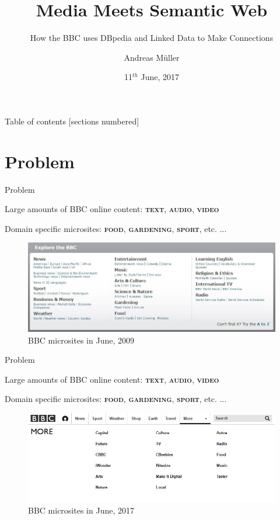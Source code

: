\documentclass[10pt]{beamer}
\title{Media Meets Semantic Web}
\subtitle{How the BBC uses DBpedia and Linked Data to Make Connections}
\date{11$^{th}$ June, 2017}
\author{Andreas Müller}
\institute{Technische Universität Berlin}
\begin{document}
\maketitle

\begin{frame}{Table of contents}
  [sections numbered]
  \tableofcontents[hideallsubsections]
\end{frame}

\section{Problem}

\begin{frame}[fragile]{Problem}

  Large amounts of BBC online content: \textsc{\textbf{text}}, \textsc{\textbf{audio}}, \textsc{\textbf{video}}

  Domain specific microsites: \textsc{\textbf{food}}, \textsc{\textbf{gardening}}, \textsc{\textbf{sport}}, etc. ...

  \pause
  \begin{figure}
    \centering
      \includegraphics[width=\textwidth]{img/bbc_domains_2009}
    \caption{BBC microsites in June, 2009}
  \end{figure}

\end{frame}

\begin{frame}[fragile]{Problem}

  Large amounts of BBC online content: \textsc{\textbf{text}}, \textsc{\textbf{audio}}, \textsc{\textbf{video}}

  Domain specific microsites: \textsc{\textbf{food}}, \textsc{\textbf{gardening}}, \textsc{\textbf{sport}}, etc. ...

  \begin{figure}
    \centering
      \includegraphics[width=\textwidth]{img/bbc_domains_2017}
    \caption{BBC microsites in June, 2017}
  \end{figure}

\end{frame}
\end{document}

